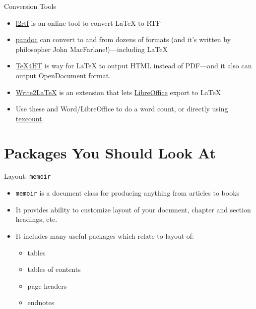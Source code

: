 \begin{frame}{Conversion Tools}

\begin{itemize}
\item \href{http://www.sciweavers.org/convert-latex-to-rtf}{l2rtf}
  is an online tool to convert \LaTeX{} to RTF
\item \href{http://johnmacfarlane.net/pandoc/}{pandoc} can convert to
  and from dozens of formats (and it's written by philosopher
  John MacFarlane!)---including \LaTeX
\item \href{http://www.tug.org/applications/tex4ht/mn.html}{TeX4HT} is
  way for \LaTeX{} to output HTML instead of PDF---and it also can
  output OpenDocument format. 
\item
  \href{http://extensions.libreoffice.org/extension-center/writer2latex-1}{Write2LaTeX}
  is an extension that lets
  \href{http://www.libreoffice.org/}{LibreOffice} export to \LaTeX{}
\item Use these and Word/LibreOffice to do a word count, or directly
  using \href{http://app.uio.no/ifi/texcount/index.html}{texcount}.
\end{itemize}

\end{frame}




\section{Packages You Should Look At}


\begin{frame}{Layout: \texttt{memoir}}

\begin{itemize}
\item \texttt{memoir} is a document class for producing anything from
  articles to books
\item It provides ability to customize layout of your document,
  chapter and section headings, etc.
\item It includes many useful packages which relate to layout of:
\begin{itemize}
\item tables
\item tables of contents
\item page headers
\item endnotes
\end{itemize}
\end{itemize}

\end{frame}

